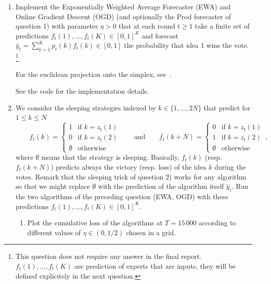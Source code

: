 \begin{enumerate}[resume]
	\item Implement the Exponentially Weighted Average Forecaster (EWA) and Online Gradient Descent (OGD) (and optionally the Prod forecaster of question 1)  with parameter $\eta >0$ that at each round $t\geq 1$ take a finite set of predictions $f_t(1),\dots, f_t(K) \in [0,1]^K$ and forecast $\hat y_t = \sum_{k=1}^K p_t(k) f_t(k) \in [0,1]$ the probability that idea 1 wins the vote. \footnote{This question does not require any answer in the final report. $f_t(1),\dots,f_t(K)$ are prediction of experts that are inputs, they will be defined explicitely in the next question.}

	For the euclidean projection onto the simplex, see~\cite{duchi2008efficient}.

\begin{solution}
 See the code for the implementation details.  
\end{solution}

	\item We consider the sleeping strategies indexed by $k \in \{1,\dots,2N\}$ that predict for $1\leq k\leq N$
	\begin{equation*}
		 \qquad f_t(k) = \left\{ 
			\begin{array}{cc}
				1 & \text{if } k = z_t(1) \\
				0 & \text{if } k = z_t(2) \\
				\emptyset & \text{otherwise}
			\end{array}
		\right. \qquad \text{and} \qquad f_t(k+N) =  \left\{ 
			\begin{array}{cc}
				0 & \text{if } k = z_t(1) \\
				1 & \text{if } k = z_t(2) \\
				\emptyset & \text{otherwise}
			\end{array}
		\right. \,,
	\end{equation*}
	where $\emptyset$ means that the strategy is sleeping.
	Basically, $f_t(k)$ (resp. $f_t(k+N)$) predicts always the victory (resp. loss) of the idea $k$ during the votes. Remark that the sleeping trick of question 2) works for any algorithm so that we might replace $\emptyset$ with the prediction of the algorithm itself $\hat y_t$. Run the two algorithms of the preceding question (EWA, OGD) with these predictions  $f_t(1),\dots, f_t(K) \in [0,1]^K$. 

	\begin{enumerate}[label=(\alph*)]
		\item Plot the cumulative loss of the algorithms at $T = 15\,000$ according to different values of $\eta \in (0,1/2)$ chosen in a grid.
	

\end{enumerate}
\end{enumerate}
